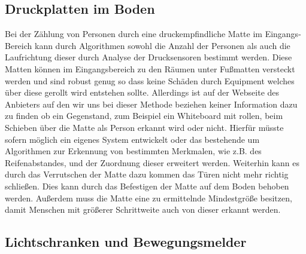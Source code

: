 
\subsection{Druckplatten im Boden}
\label{anhang:Druckplatten_im_Boden}

Bei der Zählung von Personen durch eine druckempfindliche Matte im Eingangs-
Bereich kann durch Algorithmen sowohl die Anzahl der Personen als auch die
Laufrichtung dieser durch Analyse der Drucksensoren bestimmt werden.
Diese Matten können im Eingangsbereich zu den Räumen unter Fußmatten versteckt
werden und sind robust genug so dass keine Schäden durch Equipment welches
über diese gerollt wird entstehen sollte. Allerdings ist auf der Webseite des Anbieters
\citep{http://www.instacounting.com/intro.html} auf den wir uns bei dieser
Methode beziehen keiner Information dazu zu finden ob ein Gegenstand, zum
Beispiel ein Whiteboard mit rollen, beim Schieben über die Matte als Person
erkannt wird oder nicht. Hierfür müsste sofern möglich ein eigenes System
entwickelt oder das bestehende um Algorithmen zur Erkennung von bestimmten
Merkmalen, wie z.B. des Reifenabstandes, und der Zuordnung dieser  erweitert
werden. Weiterhin kann es durch das Verrutschen der Matte dazu kommen das Türen
nicht mehr richtig schließen. Dies kann durch das Befestigen der Matte auf dem
Boden behoben werden. Außerdem muss die Matte eine zu ermittelnde Mindestgröße
besitzen, damit Menschen mit größerer Schrittweite auch von dieser erkannt
werden.

\subsection{Lichtschranken und Bewegungsmelder}
\label{anhang:Lichtschranken_und_Bewegungsmelder}

